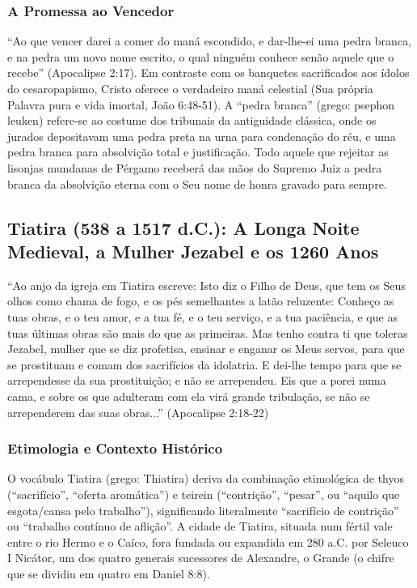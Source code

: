 \documentclass[11pt,a4paper,openany]{book}
\begin{document}
\subsubsection*{A Promessa ao Vencedor}
``Ao que vencer darei a comer do maná escondido, e dar-lhe-ei uma pedra branca, e na pedra um novo nome escrito, o qual ninguém conhece senão aquele que o recebe'' (Apocalipse 2:17). Em contraste com os banquetes sacrificados aos ídolos do cesaropapismo, Cristo oferece o verdadeiro maná celestial (Sua própria Palavra pura e vida imortal, João 6:48-51). A ``pedra branca'' (grego: psephon leuken) refere-se ao costume dos tribunais da antiguidade clássica, onde os jurados depositavam uma pedra preta na urna para condenação do réu, e uma pedra branca para absolvição total e justificação. Todo aquele que rejeitar as lisonjas mundanas de Pérgamo receberá das mãos do Supremo Juiz a pedra branca da absolvição eterna com o Seu nome de honra gravado para sempre.



\subsection{Tiatira (538 a 1517 d.C.): A Longa Noite Medieval, a Mulher Jezabel e os 1260 Anos}


``Ao anjo da igreja em Tiatira escreve: Isto diz o Filho de Deus, que tem os Seus olhos como chama de fogo, e os pés semelhantes a latão reluzente: Conheço as tuas obras, e o teu amor, e a tua fé, e o teu serviço, e a tua paciência, e que as tuas últimas obras são mais do que as primeiras. Mas tenho contra ti que toleras Jezabel, mulher que se diz profetisa, ensinar e enganar os Meus servos, para que se prostituam e comam dos sacrifícios da idolatria. E dei-lhe tempo para que se arrependesse da sua prostituição; e não se arrependeu. Eis que a porei numa cama, e sobre os que adulteram com ela virá grande tribulação, se não se arrependerem das suas obras...'' (Apocalipse 2:18-22)


\subsubsection*{Etimologia e Contexto Histórico}
O vocábulo Tiatira (grego: Thiatira) deriva da combinação etimológica de thyos (``sacrifício'', ``oferta aromática'') e teirein (``contrição'', ``pesar'', ou ``aquilo que esgota/cansa pelo trabalho''), significando literalmente ``sacrifício de contrição'' ou ``trabalho contínuo de aflição''. A cidade de Tiatira, situada num fértil vale entre o rio Hermo e o Caíco, fora fundada ou expandida em 280 a.C. por Seleuco I Nicátor, um dos quatro generais sucessores de Alexandre, o Grande (o chifre que se dividiu em quatro em Daniel 8:8).
\end{document}
